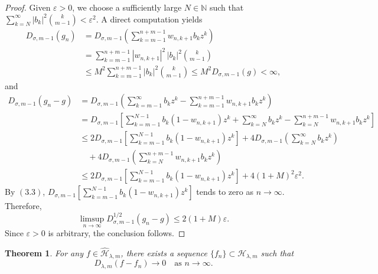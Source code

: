 \documentclass[12pt,reqno]{amsart}
\newtheorem{theorem}{Theorem}[section]
\begin{document}
\begin{proof}
  Given $ \varepsilon >0 $, we choose a sufficiently large $N\in\mathbb{N}$ such that $\sum\limits_{k = N}^\infty  {|{b_k}{|^2}} \binom{k}{m - 1}<{\varepsilon ^2}$. A direct computation yields
  \begin{align*}
  D_{\sigma ,m - 1}(g_n)
  &= D_{\sigma ,m - 1}\left( \sum_{k = m - 1}^{n + m - 1} w_{n,k + 1} b_k z^k \right) \\
  &= \sum_{k = m - 1}^{n + m - 1} |w_{n,k + 1}|^2\, |b_k|^2 \binom{k}{m - 1}\\
  & \le {M^2}\sum_{k = m - 1}^{n + m - 1} |b_k|^2 \binom{k}{m - 1} \le {M^2}{D_{\sigma ,m - 1}}(g) < \infty ,
  \end{align*}
  and
  \begin{align*}
  {D_{\sigma ,m - 1}}({g_n} - g)
  &={D_{\sigma ,m - 1}}\left( {\sum\limits_{k = m - 1}^\infty  {{b_k}} {z^k} - \sum\limits_{k = m - 1}^{n + m - 1} {{w_{n,k + 1}}} {b_k}{z^k}} \right)\\
  &={D_{\sigma ,m - 1}}\left[ {\sum\limits_{k = m - 1}^{N - 1} {{b_k}(1 - {w_{n,k + 1}}){z^k} + \sum\limits_{k = N}^\infty  {{b_k}{z^k} - \sum\limits_{k = N}^{n + m - 1} {{w_{n,k + 1}}{b_k}{z^k}} } } } \right]\\
  &\le 2{D_{\sigma ,m - 1}}\left[ {\sum\limits_{k = m - 1}^{N - 1} {{b_k}} (1 - {w_{n,k + 1}}){z^k}} \right]
  + 4 D_{\sigma ,m - 1} \left( \sum_{k = N}^{\infty} b_k z^k \right) \\
  &\quad + 4 D_{\sigma ,m - 1} \left( \sum_{k = N}^{n + m - 1} w_{n,k + 1} b_k z^k \right)\\
  &\le 2{D_{\sigma ,m - 1}}\left[ {\sum\limits_{k = m - 1}^{N - 1} {{b_k}(1 - {w_{n,k + 1}}){z^k}} } \right] + 4(1 + M)^2{\varepsilon ^2}.
  \end{align*}
By \((3.3)\), ${D_{\sigma ,m - 1}}\left[ {\sum\limits_{k = m - 1}^{N - 1} {{b_k}(1 - {w_{n,k + 1}}){z^k}} } \right]$ tends to zero as $ n \to \infty$. Therefore, $$\limsup\limits_{n \to \infty} D_{\sigma, m - 1}^{1/2}(g_n - g) \le 2(1+M){\varepsilon}.$$
Since $\varepsilon>0$ is arbitrary, the conclusion follows.
\end{proof}


\begin{theorem}\label{tm5.3}
For any \( f \in \widehat{\mathcal{H}}_{\lambda,m} \),
there exists a sequence \( \{f_n\} \subset \mathcal{H}_{\lambda,m} \)
such that
\[
D_{\lambda,m}(f-f_n)\to 0
\quad\text{as } n\to\infty.
\]
\end{theorem}
\end{document}
